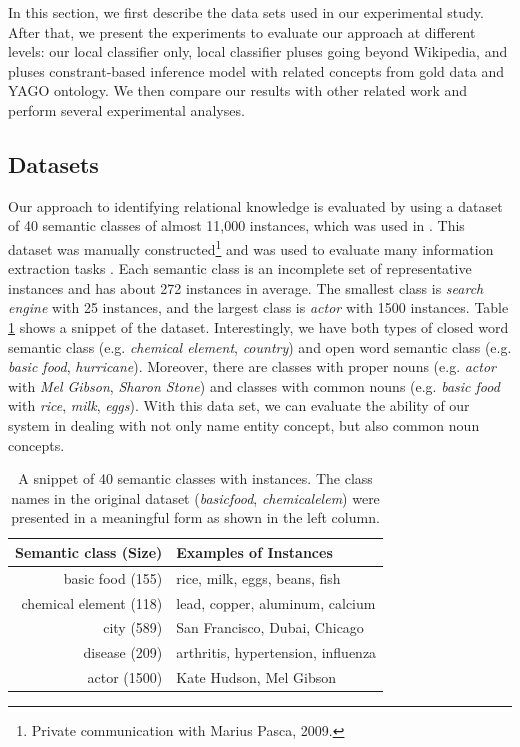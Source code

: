 In this section, we first describe the data sets used in our
experimental study. After that, we present the experiments to evaluate
our approach at different levels: our local classifier only, local
classifier pluses going beyond Wikipedia, and pluses constrant-based
inference model with related concepts from gold data and YAGO
ontology. We then compare our results with other related work and
perform several experimental analyses.

\subsection{Datasets}
\label{sec:dataset}

Our approach to identifying relational knowledge is evaluated by using
a dataset of 40 semantic classes of almost 11,000 instances, which was
used in \cite{citeulike:1587018}.  This dataset was manually
constructed\footnote{Private communication with Marius Pasca, 2009.}
and was used to evaluate many information extraction tasks
\cite{citeulike:1587018,pacsca-vandurme:2008:ACLMain}.  Each semantic
class is an incomplete set of representative instances and has about
272 instances in average. The smallest class is {\em search engine}
with 25 instances, and the largest class is {\em actor} with 1500
instances. Table \ref{table:class-instance} shows a snippet of the
dataset. Interestingly, we have both types of closed word semantic
class (e.g. {\em chemical element}, {\em country}) and open word
semantic class (e.g. {\em basic food}, {\em hurricane}). Moreover,
there are classes with proper nouns (e.g. {\em actor} with {\em Mel
  Gibson}, {\em Sharon Stone}) and classes with common nouns
(e.g. {\em basic food} with {\em rice}, {\em milk}, {\em eggs}). With this
data set, we can evaluate the ability of our system in dealing with not only
name entity concept, but also common noun concepts.

\begin{table}[h]
\small
  \centering
  \begin{tabular}{|r|l|}
    \hline
    \textbf{Semantic class (Size)} & \textbf{Examples of Instances} \\
    \hline
    \hline
    basic food (155) & rice, milk, eggs, beans, fish \\
    \hline
    chemical element (118) & lead, copper, aluminum, calcium \\
    \hline
    city (589) & San Francisco, Dubai, Chicago \\
    \hline
    disease (209) & arthritis, hypertension, influenza \\
    \hline
    actor (1500) & Kate Hudson, Mel Gibson \\
    \hline
  \end{tabular}
  \caption{A snippet of 40 semantic classes with instances. 
    The class names in the original dataset ({\em basicfood}, 
    {\em chemicalelem}) were presented in a meaningful form
    as shown in the left column.}
  \label{table:class-instance}
\end{table}

